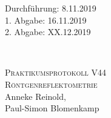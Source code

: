 



\begin{titlepage}
  \begin{flushleft}
 Durchführung: 8.11.2019\\
 1. Abgabe: 16.11.2019\\
 2. Abgabe: XX.12.2019
  \end{flushleft}


\HRule\\[1,0cm]

 \begin{center}


\textsc{\LARGE Praktikumsprotokoll V44}\\[1.5cm]
\textsc{\huge Röntgenreflektometrie} \\[5,5cm]

Anneke Reinold\footnotemark[1], \\
Paul-Simon Blomenkamp\footnotemark[2] \\[1,0cm]



 \end{center}
\HRule

 \vfill
\end{titlepage}






\printbibliography


